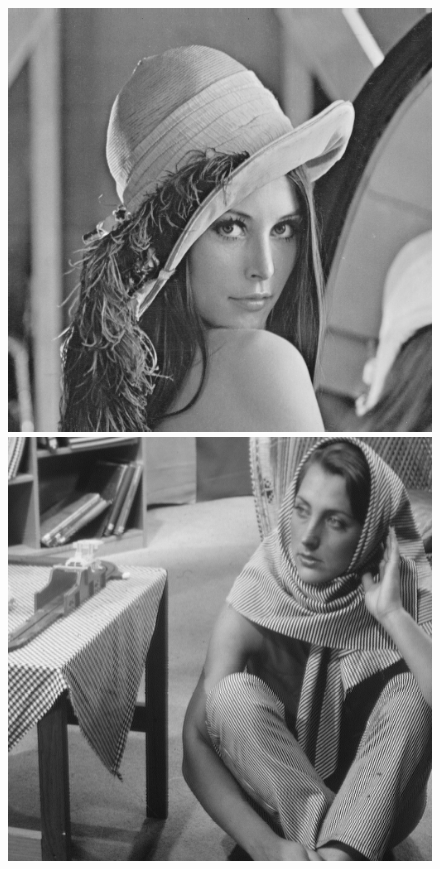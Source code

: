 \documentclass{article}
\begin{document}
\begin{figure}[!htb]
\centering
\includegraphics[scale=0.2]{img/lena_8bit.png}
\includegraphics[scale=0.2]{img/barbara_8bit.png} 

\end{figure}
\end{document}
